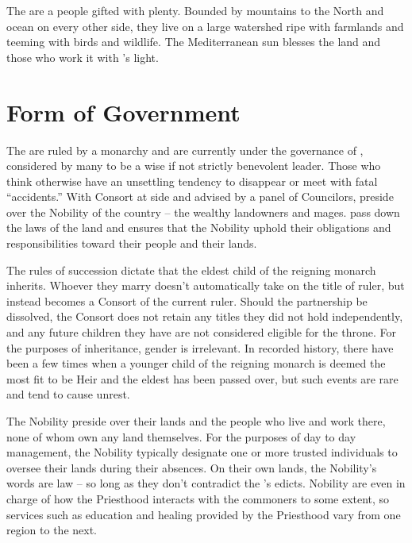 \documentclass[blue]{GL2020}
\begin{document}
\name{\bAgrarians{}}

The \pFarmers{} are a people gifted with plenty.  Bounded by mountains to the North and ocean on every other side, they live on a large watershed ripe with farmlands and teeming with birds and wildlife.  The Mediterranean sun blesses the land and those who work it with \cFarmGod{}’s light.   

\section*{Form of Government}
The \pFarm{} are ruled by a monarchy and are currently under the governance of \cQueen{\full}, considered by many to be a wise if not strictly benevolent leader.  Those who think otherwise have an unsettling tendency to disappear or meet with fatal ``accidents.''  With \cQueen{\their} Consort at \cQueen{\their} side and advised by a panel of Councilors, \cQueen{\they} preside\cQueen{\plural} over the Nobility of the country -- the wealthy landowners and mages.  \cQueen{\They} pass\cQueen{\pluralC} down the laws of the land and ensures that the Nobility uphold their obligations and responsibilities toward their people and their lands.

The rules of succession dictate that the eldest child of the reigning monarch inherits.  Whoever they marry doesn't automatically take on the title of ruler, but instead becomes a Consort of the current ruler.  Should the partnership be dissolved, the Consort does not retain any titles they did not hold independently, and any future children they have are not considered eligible for the throne.  For the purposes of inheritance, gender is irrelevant.  In recorded history, there have been a few times when a younger child of the reigning monarch is deemed the most fit to be Heir and the eldest has been passed over, but such events are rare and tend to cause unrest.

The Nobility preside over their lands and the people who live and work there, none of whom own any land themselves.  For the purposes of day to day management, the Nobility typically designate one or more trusted individuals to oversee their lands during their absences.  On their own lands, the Nobility's words are law – so long as they don't contradict the \cQueen{\Majesty}'s edicts.  Nobility are even in charge of how the Priesthood interacts with the commoners to some extent, so services such as education and healing provided by the Priesthood vary from one region to the next.
\end{document}
